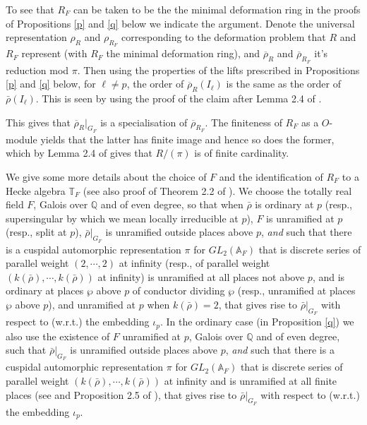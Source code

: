 \documentclass[12pt]{amsart}
\newcommand{\T}{\mathbb{T}}
\newcommand{\A}{\mathbb{A}}
\newcommand{\Q}{\mathbb{Q}}
\newcommand{\rhobar}{\overline{\rho}}
\def\rhobar{ {\bar {\rho} } }
\begin{document}
To see that $R_F$ can be taken to be the the minimal deformation ring in the 
proofs of Propositions \ref{p} and \ref{q} below we indicate the argument. Denote the universal representation $\rho_R$ and $\rho_{R_F}$ corresponding
to the deformation problem that $R$ and $R_F$ represent (with $R_F$ the minimal deformation ring), and $\overline \rho_R$ and $\overline \rho_{R_F}$ it's reduction mod $\pi$. Then using the properties of the lifts prescribed in 
Propositions \ref{p} and \ref{q} below, for $\ell \neq p$, the order of ${\overline \rho_R} (I_\ell)$ is the same as the order of $\rhobar(I_\ell)$. This is seen by using the proof of the claim after Lemma 2.4 of \cite{KW}. 

This gives that
${\overline \rho_R}|_{G_F}$ is a specialisation of $\overline \rho_{R_F}$. 
The finiteness of $R_F$ as a $O$-module yields that the latter has finite image and hence so does the former, which by Lemma 2.4 of \cite{KW} gives that
$R/(\pi)$ is of finite cardinality. 

We give some more details about the choice of $F$ and the identification of $R_F$ to
a Hecke algebra $\T_F$ (see also proof of Theorem 2.2 of \cite{KW}).
We choose the totally real field $F$, Galois over $\Q$ and of even degree, so that when $\rhobar$ is ordinary at $p$ (resp., supersingular by which we mean locally irreducible at $p$), $F$ is unramified at $p$ 
(resp., split at $p$),
$\rhobar|_{G_F}$ is unramified outside places above $p$, {\it and} such that there is a cuspidal automorphic representation $\pi$ for $GL_2(\A_F)$
that is discrete series of parallel weight $(2,\cdots,2)$ at infinity (resp.,
of parallel weight $(k(\rhobar),\cdots,k(\rhobar))$ at infinity) is unramified at all places not above $p$, and is ordinary at places $\wp$ above $p$ 
of conductor dividing $\wp$ (resp., unramified at places $\wp$ above $p$), and unramified at $p$ when $k(\rhobar)=2$,
that gives rise to $\rhobar|_{G_F}$ with respect to (w.r.t.) the 
embedding $\iota_p$. In the ordinary case (in Proposition \ref{q})
we also use the existence of $F$ unramified at $p$, 
Galois over $\Q$ and of even degree, such that $\rhobar|_{G_F}$ is unramified outside places above $p$, {\it and} such that there is a cuspidal automorphic representation $\pi$ for $GL_2(\A_F)$
that is discrete series of parallel weight $(k(\rhobar),\cdots,k(\rhobar))$ at infinity and is unramified at all finite places (see \cite{Tay1} and Proposition 2.5 of \cite{KW}), that gives rise to $\rhobar|_{G_F}$ with respect to (w.r.t.) the 
embedding $\iota_p$.
\end{document}
